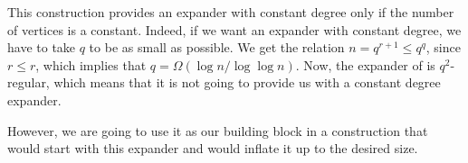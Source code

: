 \bigskip

This construction provides an expander with constant degree only if
the number of vertices is a constant.  Indeed, if we want an expander
with constant degree, we have to take $q$ to be as small as possible.
We get the relation $n = q^{r+1}\leq q^{q}$, since $r \leq r$, which
implies that $q = \Omega( \log n /\log \log n)$. Now, the expander of
 is $q^2$-regular, which means that it is not going
to provide us with a constant degree expander.

However, we are going to use it as our building block in a
construction that would start with this expander and would inflate it
up to the desired size.







% 
%

\ChapterEnd{}

 
